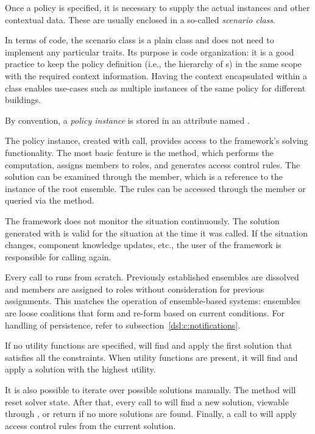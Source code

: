 Once a policy is specified, it is necessary to supply the actual 
instances and other contextual data. These are usually enclosed in a so-called
\textit{scenario class}.

In terms of code, the scenario class is a plain class and does not need to implement any
particular traits. Its purpose is code organization: it is a good practice to keep the
policy definition (i.e., the hierarchy of s) in the same scope with the
required context information. Having the context encapsulated within a class enables
use-cases such as multiple instances of the same policy for different buildings.

By convention, a \textit{policy instance} is stored in an attribute named .

The policy instance, created with  call, provides access to the
framework's solving functionality. The most basic feature is the  method,
which performs the computation, assigns members to roles, and generates access control
rules. The solution can be examined through the  member, which is a
reference to the instance of the root ensemble. The rules can be accessed through the
 member or queried via the  method.

The framework does not monitor the situation continuously. The solution generated with
 is valid for the situation at the time it was called. If the situation
changes, component knowledge updates, etc., the user of the framework is responsible for
calling  again.

Every call to  runs from scratch. Previously established ensembles are
dissolved and members are assigned to roles without consideration for previous
assignments. This matches the operation of ensemble-based systems: ensembles are loose
coalitions that form and re-form based on current conditions. For handling of
persistence, refer to subsection~\ref{dsl:c:notifications}.

If no utility functions are specified,  will find and apply the first
solution that satisfies all the constraints. When utility functions are present, it will
find and apply a solution with the highest utility.

It is also possible to iterate over possible solutions manually. The  method
will reset solver state. After that, every call to  will find a new
solution, viewable through , or return  if no more solutions are
found. Finally, a call to  will apply access control rules from the current
solution.

